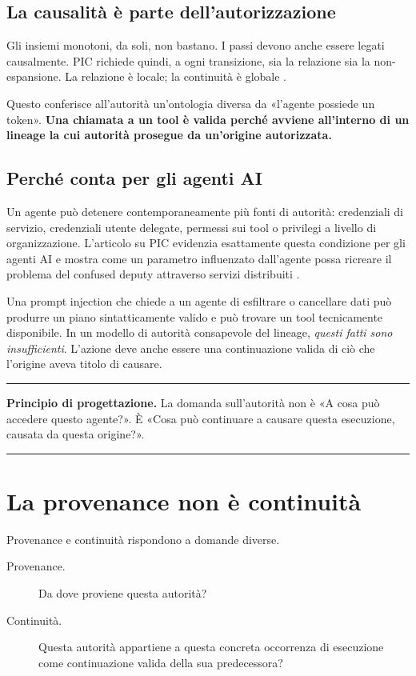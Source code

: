 \documentclass[10pt,oneside,openany]{book}
\newcommand{\principle}[1]{%
  \vspace{4pt}
  \noindent\begin{minipage}{\linewidth}
  \hrule\vspace{5pt}
  \small\sffamily\raggedright\textbf{Principio di progettazione.} #1
  \vspace{5pt}\hrule
  \end{minipage}\vspace{4pt}
}
\begin{document}
\section{La causalità è parte dell'autorizzazione}
Gli insiemi monotoni, da soli, non bastano. I passi devono anche essere legati causalmente. PIC richiede quindi, a ogni transizione, sia la relazione sia la non-espansione. La relazione è locale; la continuità è globale \cite{gallo2026pic}.

Questo conferisce all'autorità un'ontologia diversa da «l'agente possiede un token». \textbf{Una chiamata a un tool è valida perché avviene all'interno di un lineage la cui autorità prosegue da un'origine autorizzata.}

\section{Perché conta per gli agenti AI}
Un agente può detenere contemporaneamente più fonti di autorità: credenziali di servizio, credenziali utente delegate, permessi sui tool o privilegi a livello di organizzazione. L'articolo su PIC evidenzia esattamente questa condizione per gli agenti AI e mostra come un parametro influenzato dall'agente possa ricreare il problema del confused deputy attraverso servizi distribuiti \cite{gallo2026pic}.

Una prompt injection che chiede a un agente di esfiltrare o cancellare dati può produrre un piano sintatticamente valido e può trovare un tool tecnicamente disponibile. In un modello di autorità consapevole del lineage, \emph{questi fatti sono insufficienti}. L'azione deve anche essere una continuazione valida di ciò che l'origine aveva titolo di causare.

\principle{La domanda sull'autorità non è «A cosa può accedere questo agente?». È «Cosa può continuare a causare questa esecuzione, causata da questa origine?».}


\chapter{La provenance non è continuità}

Provenance e continuità rispondono a domande diverse.

\begin{description}
\item[Provenance.] Da dove proviene questa autorità?
\item[Continuità.] Questa autorità appartiene a questa concreta occorrenza di esecuzione come continuazione valida della sua predecessora?
\end{description}
\end{document}
